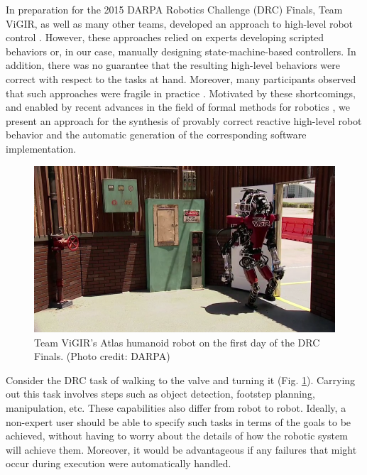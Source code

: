 
In preparation for the 2015 DARPA Robotics Challenge (DRC) Finals, Team ViGIR, as well as many other teams, developed an approach to high-level robot control \cite{Philipp2015MSc}.
However, these approaches relied on experts developing scripted behaviors or, in our case, manually designing state-machine-based controllers.
In addition, there was no guarantee that the resulting high-level behaviors were correct with respect to the tasks at hand.
Moreover, many participants observed that such approaches were fragile in practice \cite{DRC-what-happened}.
Motivated by these shortcomings, and enabled by recent advances in the field of formal methods for robotics 
\cite{Vasu2013ICRA, Vasu2015TRO, JFRKG2012ICRA, Lignos2015AURO, Kavraki2015AAAI, Kavraki2015ICRA, Belta2014TAC, Fainekos2014ICRA, Dimos2014ICRA, Jon2015ICRA, Ben2015IJRR, Wolff2014ICRA, Ankur2015ISRR, Finucane2010IROS, Topcu2011RAM}, 
we present an approach for the synthesis of provably correct reactive high-level robot behavior and the 
automatic generation of the corresponding software implementation.

\begin{figure}[t]
\centering
\includegraphics[width=0.99\columnwidth,clip]{./img/atlas_door_finals.png}
\caption{Team ViGIR's Atlas humanoid robot on the first day of the DRC Finals. (Photo credit: DARPA)
}
\label{Fig:AtlasDoorFinals}
\vspace{-10pt}
\end{figure}

\begin{myExample}\label{Ex:TurnValve}
	Consider the DRC task of walking to the valve and turning it (Fig. \ref{Fig:AtlasDoorFinals}).
	Carrying out this task involves steps such as object detection, footstep planning, manipulation, etc.
	These capabilities also differ from robot to robot.
	Ideally, a non-expert user should be able to specify such tasks in terms of the goals to be achieved, without having to worry about the details of how the robotic system will achieve them.
	Moreover, it would be advantageous if any failures that might occur during execution were automatically handled.
\end{myExample}

